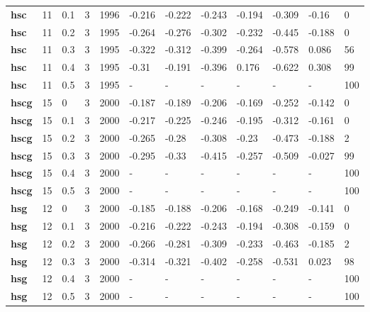 \begin{longtable}[h]{|p{0.8cm}|p{1.5cm}|p{1cm}|p{1cm}|p{1cm}|p{1cm}|p{1cm}|p{1cm}|p{1cm}|p{1cm}|p{1cm}|p{1.5cm}|}
           \\
  \textbf{hsc } &  11         & 0.1 & 3 & 1996 & -0.216 & -0.222 & -0.243 & -0.194 & -0.309 &  -0.16 &   0
           \\
  \textbf{hsc } &  11         & 0.2 & 3 & 1995 & -0.264 & -0.276 & -0.302 & -0.232 & -0.445 & -0.188 &   0
           \\
  \textbf{hsc } &  11         & 0.3 & 3 & 1995 & -0.322 & -0.312 & -0.399 & -0.264 & -0.578 &  0.086 &  56
           \\
  \textbf{hsc } &  11         & 0.4 & 3 & 1995 &  -0.31 & -0.191 & -0.396 &  0.176 & -0.622 &  0.308 &  99
           \\
  \textbf{hsc } &  11         & 0.5 & 3 & 1995 & - & - & - & - & - & - & 100
           \\
  \textbf{hscg} &  15         &   0 & 3 & 2000 & -0.187 & -0.189 & -0.206 & -0.169 & -0.252 & -0.142 &   0
           \\
  \textbf{hscg} &  15         & 0.1 & 3 & 2000 & -0.217 & -0.225 & -0.246 & -0.195 & -0.312 & -0.161 &   0
           \\
  \textbf{hscg} &  15         & 0.2 & 3 & 2000 & -0.265 &  -0.28 & -0.308 &  -0.23 & -0.473 & -0.188 &   2
           \\
  \textbf{hscg} &  15         & 0.3 & 3 & 2000 & -0.295 &  -0.33 & -0.415 & -0.257 & -0.509 & -0.027 &  99
           \\
  \textbf{hscg} &  15         & 0.4 & 3 & 2000 & - & - & - & - & - & - & 100
           \\
  \textbf{hscg} &  15         & 0.5 & 3 & 2000 & - & - & - & - & - & - & 100
           \\
  \textbf{hsg } &  12         &   0 & 3 & 2000 & -0.185 & -0.188 & -0.206 & -0.168 & -0.249 & -0.141 &   0
           \\
  \textbf{hsg } &  12         & 0.1 & 3 & 2000 & -0.216 & -0.222 & -0.243 & -0.194 & -0.308 & -0.159 &   0
           \\
  \textbf{hsg } &  12         & 0.2 & 3 & 2000 & -0.266 & -0.281 & -0.309 & -0.233 & -0.463 & -0.185 &   2
           \\
  \textbf{hsg } &  12         & 0.3 & 3 & 2000 & -0.314 & -0.321 & -0.402 & -0.258 & -0.531 &  0.023 &  98
           \\
  \textbf{hsg } &  12         & 0.4 & 3 & 2000 & - & - & - & - & - & - & 100
           \\
  \textbf{hsg } &  12         & 0.5 & 3 & 2000 & - & - & - & - & - & - & 100
           \\
 \end{longtable}
